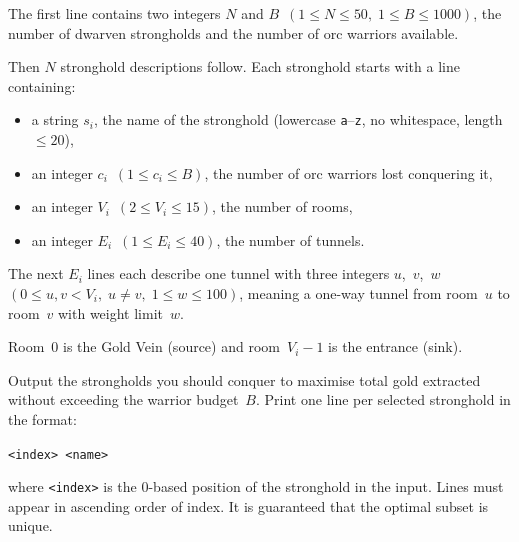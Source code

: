 \begin{Input}
The first line contains two integers $N$ and
$B$~$(1 \le N \le 50,\; 1 \le B \le 1000)$,
the number of dwarven strongholds and the number of orc warriors
available.

Then $N$ stronghold descriptions follow. Each stronghold starts with
a line containing:
\begin{itemize}
  \item a string $s_i$, the name of the stronghold
        (lowercase \texttt{a}--\texttt{z}, no whitespace,
        length $\le 20$),
  \item an integer $c_i$~$(1 \le c_i \le B)$, the number of orc
        warriors lost conquering it,
  \item an integer $V_i$~$(2 \le V_i \le 15)$, the number of rooms,
  \item an integer $E_i$~$(1 \le E_i \le 40)$, the number of tunnels.
\end{itemize}

The next $E_i$ lines each describe one tunnel with three integers
$u$,~$v$,~$w$~$(0 \le u, v < V_i,\; u \ne v,\; 1 \le w \le 100)$,
meaning a one-way tunnel from room~$u$ to room~$v$ with weight
limit~$w$.

Room~$0$ is the Gold Vein (source) and room~$V_i - 1$ is the
entrance (sink).
\end{Input}

\begin{Output}
Output the strongholds you should conquer to maximise total gold
extracted without exceeding the warrior budget~$B$.
Print one line per selected stronghold in the format:

\texttt{\quad <index> <name>}

\noindent
where \texttt{<index>} is the 0-based position of the stronghold in
the input. Lines must appear in ascending order of index.
It is guaranteed that the optimal subset is unique.
\end{Output}
